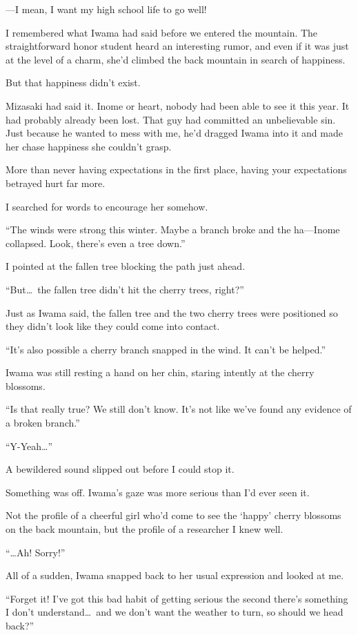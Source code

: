 \documentclass[
    a4paper,
    12pt,
    twoside,
    openany,
    UTF8,
    fontset=windows
]{ctexbook}
\begin{document}
---I mean, I want my high school life to go well!

I remembered what Iwama had said before we entered the mountain. The straightforward honor student heard an interesting rumor, and even if it was just at the level of a charm, she'd climbed the back mountain in search of happiness.

But that happiness didn't exist.

Mizasaki had said it. Inome or heart, nobody had been able to see it this year. It had probably already been lost. That guy had committed an unbelievable sin. Just because he wanted to mess with me, he'd dragged Iwama into it and made her chase happiness she couldn't grasp.

More than never having expectations in the first place, having your expectations betrayed hurt far more.

I searched for words to encourage her somehow.

``The winds were strong this winter. Maybe a branch broke and the ha---Inome collapsed. Look, there's even a tree down.''

I pointed at the fallen tree blocking the path just ahead.

``But\dots\ the fallen tree didn't hit the cherry trees, right?''

Just as Iwama said, the fallen tree and the two cherry trees were positioned so they didn't look like they could come into contact.

``It's also possible a cherry branch snapped in the wind. It can't be helped.''

Iwama was still resting a hand on her chin, staring intently at the cherry blossoms.

``Is that really true? We still don't know. It's not like we've found any evidence of a broken branch.''

``Y-Yeah\dots''

A bewildered sound slipped out before I could stop it.

Something was off. Iwama's gaze was more serious than I'd ever seen it.

Not the profile of a cheerful girl who'd come to see the `happy' cherry blossoms on the back mountain, but the profile of a researcher I knew well.

``\dots Ah! Sorry!''

All of a sudden, Iwama snapped back to her usual expression and looked at me.

``Forget it! I've got this bad habit of getting serious the second there's something I don't understand\dots\ and we don't want the weather to turn, so should we head back?''
\end{document}
